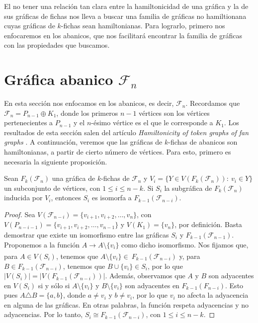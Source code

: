 El no tener una relaci\'on tan clara entre la hamiltonicidad de una gr\'afica y
la de sus gr\'aficas de fichas nos lleva a buscar una familia de gr\'aficas no
hamiltionana cuyas gr\'aficas de $k$-fichas sean hamiltonianas. Para lograrlo,
primero nos enfocaremos en los abanicos, que nos facilitar\'a encontrar la
familia de gr\'aficas con las propiedades que buscamos.

\section{Gr\'afica abanico \texorpdfstring{$\mathcal{F}_n$}{Fn}}%
\label{sec:SimpleFan}

En esta secci\'on nos enfocamos en los abanicos, es decir, $\mathcal{F}_n$.
Recordamos que 
\linebreak
$\mathcal{F}_n = P_{n-1} \oplus K_1$, donde los primeros $n-1$ v\'ertices son
los v\'ertices pertenecientes a $P_{n-1}$ y el $n$-\'esimo v\'ertice es el que
le corresponde a $K_1$. Los resultados de esta secci\'on salen del art\'iculo
\textit{Hamiltonicity of token graphs of fan graphs} \cite{riveraHamilt}. A
continuaci\'on, veremos que las gr\'aficas de $k$-fichas de abanicos son
hamiltonianas, a partir de cierto n\'umero de v\'ertices. Para esto, primero es
necesaria la siguiente proposici\'on.

\begin{proposicion}
\label{prop:iso-SFan}
    Sean $F_k(\mathcal{F}_n)$ una gr\'afica de $k$-fichas de $\mathcal{F}_n$ y
    \linebreak
    $V_i=\{ Y \in V(F_k(\mathcal{F}_n)) \colon\ v_i \in Y \}$ un subconjunto de
    v\'ertices, con $1 \leq i \leq n-k$. Si $S_i$ la subgr\'afica de
    $F_k(\mathcal{F}_n)$ inducida  por $V_i$, entonces $S_i$ es isomorfa a
    $F_{k-1}(\mathcal{F}_{n-i})$.
\end{proposicion}
    
\begin{proof}
    Sea $V(\mathcal{F}_{n-i}) = \{v_{i+1}, v_{i+2}, \dots, v_n\}$, con
    $V(P_{n-i-1}) = \{v_{i+1}, v_{i+2}, \dots, v_{n-1}\}$ y $V(K_1)= \{v_n\}$,
    por definici\'on. Basta demostrar que existe un isomorfismo entre las
    gr\'aficas $S_i$ y $F_{k-1}(\mathcal{F}_{n-1})$. Proponemos a la funci\'on
    $A \xrightarrow[]{} A \setminus \{v_i\}$ como dicho isomorfismo. Nos fijamos
    que, para $A \in V(S_i)$, tenemos que $A \setminus \{v_i\} \in \
    F_{k-1}(\mathcal{F}_{n-i})$ y, para $B \in F_{k-1}(\mathcal{F}_{n-i})$,
    tenemos que $B \cup \{v_i\} \in S_i$, por lo que
    $|V(S_i)|=|V(F_{k-1}(\mathcal{F}_{n-i}))|$. Adem\'as, observamos que $A$ y
    $B $ son adyacentes en $V(S_i)$ si y s\'olo si $A \setminus \{v_i\}$ y $B
    \setminus \{v_i\}$ son adyacentes en $F_{k-1}(F_{n-i})$. Esto pues
    $A\triangle B = \{a,b\}$, donde $a\neq v_i$ y $b \neq v_i$, por lo que $v_i$
    no afecta la adyacencia en alguna de las gr\'aficas. En otras palabras, la
    funci\'on respeta adyacencias y no adyacencias. Por lo tanto, $S_i \cong
    F_{k-1}(\mathcal{F}_{n-i})$, con $1 \leq i \leq n-k$.
\end{proof}

